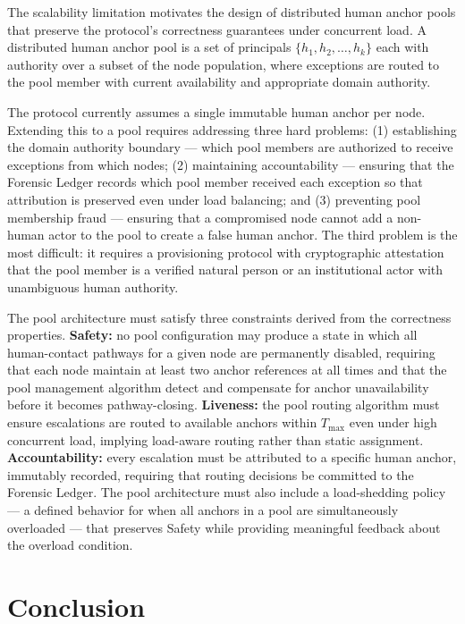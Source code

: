 The scalability limitation motivates the design of distributed human anchor pools that preserve the protocol's correctness guarantees under concurrent load. A distributed human anchor pool is a set of principals $\{h_1, h_2, \ldots, h_k\}$ each with authority over a subset of the node population, where exceptions are routed to the pool member with current availability and appropriate domain authority.

The protocol currently assumes a single immutable human anchor per node. Extending this to a pool requires addressing three hard problems: (1) establishing the domain authority boundary --- which pool members are authorized to receive exceptions from which nodes; (2) maintaining accountability --- ensuring that the Forensic Ledger records which pool member received each exception so that attribution is preserved even under load balancing; and (3) preventing pool membership fraud --- ensuring that a compromised node cannot add a non-human actor to the pool to create a false human anchor. The third problem is the most difficult: it requires a provisioning protocol with cryptographic attestation that the pool member is a verified natural person or an institutional actor with unambiguous human authority.

The pool architecture must satisfy three constraints derived from the correctness properties. \textbf{Safety:} no pool configuration may produce a state in which all human-contact pathways for a given node are permanently disabled, requiring that each node maintain at least two anchor references at all times and that the pool management algorithm detect and compensate for anchor unavailability before it becomes pathway-closing. \textbf{Liveness:} the pool routing algorithm must ensure escalations are routed to available anchors within $T_{\max}$ even under high concurrent load, implying load-aware routing rather than static assignment. \textbf{Accountability:} every escalation must be attributed to a specific human anchor, immutably recorded, requiring that routing decisions be committed to the Forensic Ledger. The pool architecture must also include a load-shedding policy --- a defined behavior for when all anchors in a pool are simultaneously overloaded --- that preserves Safety while providing meaningful feedback about the overload condition.

\section{Conclusion}
\label{sec:conclusion}

